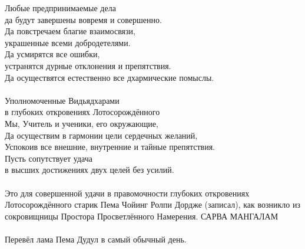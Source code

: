 Любые предпринимаемые дела \\ \indent да будут завершены вовремя и совершенно.\\
Да повстречаем благие взаимосвязи, \\ \indent украшенные всеми добродетелями. \\
Да усмирятся все ошибки, \\ \indent устранятся дурные отклонения и препятствия.\\
Да осуществятся естественно все дхармические помыслы.\\
\\
Уполномоченные Видьядхарами \\ \indent в глубоких откровениях Лотосорождённого \\
Мы, Учитель и ученики, его окружающие, \\
Да осуществим в гармонии цели сердечных желаний,\\
Успокоив все внешние, внутренние и тайные препятствия.\\
Пусть сопутствует удача \\ \indent в высших достижениях двух целей без усилий.\\
\\
\scriptsize
Это для совершенной удачи в правомочности глубоких откровениях
Лотосорождённого старик Пема Чойинг Ролпи Дордже (записал),
как возникло из сокровищницы Простора Просветлённого Намерения. САРВА МАНГАЛАМ\\
\\
Перевёл лама Пема Дудул в самый обычный день.\normalsize
